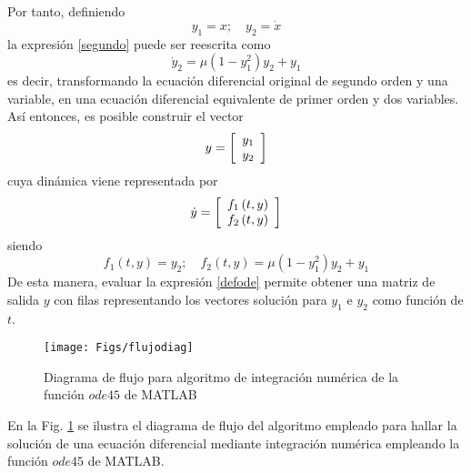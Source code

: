 Por tanto, definiendo
$$y_1 = x; \quad y_2 = \dot{x}$$
la expresión \eqref{segundo} puede ser reescrita como
$$
\dot{y}_2 = \mu \left( 1 - y_1^2 \right) y_2 + y_1
$$
es decir, transformando la ecuación diferencial original de segundo orden y una variable, en una ecuación diferencial equivalente de primer orden y dos variables. Así entonces, es posible construir el vector
$$
y = \left[ {\begin{array}{*{20}c}
   y_1  \\
   y_2  \\
\end{array}} \right]
$$
cuya dinámica viene representada por
$$
\dot{y} = \left[ {\begin{array}{*{20}c}
   f_1 \left(t, y \right)  \\
   f_2 \left(t, y \right) \\
\end{array}} \right]
$$
siendo
$$f_1\left(t, y \right) = y_2; \quad f_2\left(t, y \right) =  \mu \left( 1 - y_1^2 \right) y_2 + y_1$$
De esta manera, evaluar la expresión \eqref{defode} permite obtener una matriz de salida $y$ con filas representando los vectores solución para $y_1$ e $y_2$ como función de $t$.\\

\begin{figure}[h]
\centering
\texttt{[image: Figs/flujodiag]}
\caption[]{Diagrama de flujo para algoritmo de integración numérica de la función $ode45$ de MATLAB}\label{flujodiag}
\end{figure}

En la Fig. \ref {flujodiag} se ilustra el diagrama de flujo del algoritmo empleado para hallar la solución de una ecuación diferencial mediante integración numérica empleando la función $ode45$ de MATLAB.\\

